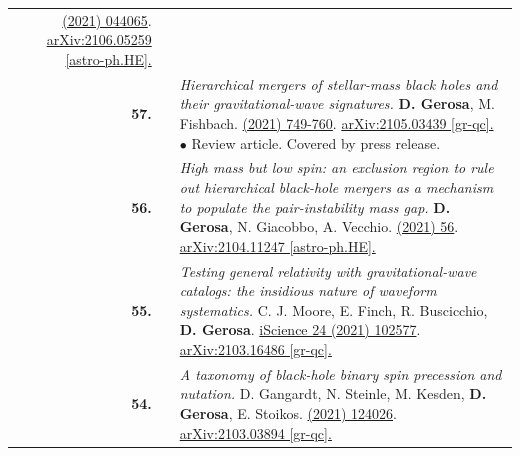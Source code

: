 {\begin{longtable}{rp{0.3cm}p{15.8cm}}
\newline{}
\href{https://journals.aps.org/prd/abstract/10.1103/PhysRevD.104.044065}{\prd 104 (2021) 044065}. \href{https://arxiv.org/abs/2106.05259}{arXiv:2106.05259 [astro-ph.HE].}
\vspace{0.09cm}\\
%
\textbf{57.} & & \textit{Hierarchical mergers of stellar-mass black holes and their gravitational-wave signatures.}
\newline{}
\textbf{D. Gerosa}, M. Fishbach.
\newline{}
\href{https://www.nature.com/articles/s41550-021-01398-w}{\natastro 5 (2021) 749-760}. \href{https://arxiv.org/abs/2105.03439}{arXiv:2105.03439 [gr-qc].}
\newline{}
\textcolor{color1}{$\bullet$} Review article. Covered by press release.
\vspace{0.09cm}\\
%
\textbf{56.} & & \textit{High mass but low spin: an exclusion region to rule out hierarchical black-hole mergers as a mechanism to populate the pair-instability mass gap.}
\newline{}
\textbf{D. Gerosa}, N. Giacobbo, A. Vecchio.
\newline{}
\href{https://iopscience.iop.org/article/10.3847/1538-4357/ac00bb}{\apj 915 (2021) 56}. \href{https://arxiv.org/abs/2104.11247}{arXiv:2104.11247   [astro-ph.HE].}
\vspace{0.09cm}\\
%
\textbf{55.} & & \textit{Testing general relativity with gravitational-wave catalogs: the insidious nature of waveform systematics.}
\newline{}
C. J. Moore, E. Finch, R. Buscicchio, \textbf{D. Gerosa}.
\newline{}
\href{https://www.sciencedirect.com/science/article/pii/S2589004221005459}{iScience 24 (2021) 102577}. \href{https://arxiv.org/abs/2103.16486}{arXiv:2103.16486   [gr-qc].}
\vspace{0.09cm}\\
%
\textbf{54.} & & \textit{A taxonomy of black-hole binary spin precession and nutation.}
\newline{}
D. Gangardt, N. Steinle, M. Kesden, \textbf{D. Gerosa}, E. Stoikos.
\newline{}
\href{https://journals.aps.org/prd/abstract/10.1103/PhysRevD.103.124026}{\prd 103 (2021) 124026}. \href{https://arxiv.org/abs/2103.03894}{arXiv:2103.03894 [gr-qc].}
\vspace{0.09cm}\\

\end{longtable}}
